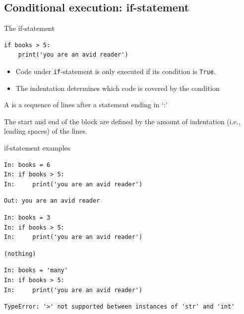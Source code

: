 \documentclass[aspectratio=169,usenames,dvipsnames]{beamer}
\begin{document}
\subsection{Conditional execution: if-statement}
\frame{\tableofcontents[currentsubsection]}

\begin{frame}[fragile]{The if-statement}
\begin{lstlisting}
if books > 5:
    print('you are an avid reader')
\end{lstlisting}

    \begin{itemize}
        \item Code under \lstinline{if}-statement is only executed
            if its condition is \lstinline{True}.
        \item The indentation determines which code is covered
            by the condition
    \end{itemize}

    \pause
    \begin{definition}
        A  is a sequence of lines after
        a statement ending in `:'

        The start and end of the block are defined by the amount of indentation
        (i.e., leading spaces) of the lines.
    \end{definition}
\end{frame}

\begin{frame}[fragile]{if-statement examples}
\begin{lstlisting}
In: books = 6
In: if books > 5:
In:     print('you are an avid reader')
\end{lstlisting}\vspace{-1em}\pause\begin{lstlisting}[style=plain]
Out: you are an avid reader
\end{lstlisting}
\pause
\begin{lstlisting}
In: books = 3
In: if books > 5:
In:     print('you are an avid reader')
\end{lstlisting}\vspace{-1em}\pause\begin{lstlisting}[style=plain]
(nothing)
\end{lstlisting}
\pause
\begin{lstlisting}
In: books = 'many'
In: if books > 5:
In:     print('you are an avid reader')
\end{lstlisting}\vspace{-1em}\pause\begin{lstlisting}[style=plain]
TypeError: '>' not supported between instances of 'str' and 'int'
\end{lstlisting}
\end{frame}
\end{document}

